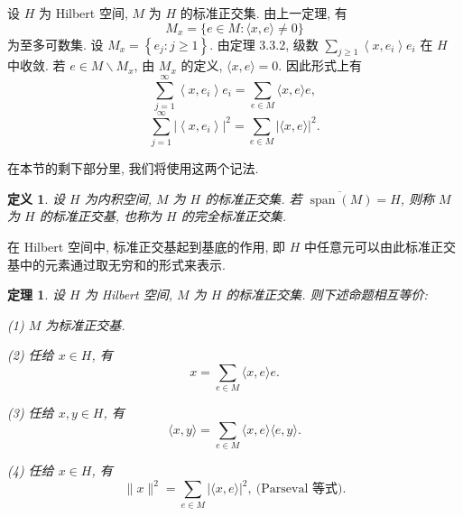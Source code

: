 \documentclass[openany]{ctexbook}
\theoremstyle{kaiti}
\newtheorem{definition}{定义}[section]
\newtheorem{theorem}{定理}[section]
\theoremstyle{normal}
\begin{document}
设 $H$ 为 Hilbert 空间, $M$ 为 $H$ 的标准正交集. 由上一定理, 有
$$
M_{x}=\{e \in M:\langle x, e\rangle \neq 0\}
$$
为至多可数集. 设 $M_{x}=\left\{e_{j}: j \geqslant 1\right\}$. 由定理 3.3.2, 级数 $\sum_{j \geqslant 1}\left\langle x, e_{i}\right\rangle e_{i}$ 在 $H$ 中收敛. 若 $e \in M \backslash M_{x}$, 由 $M_{x}$ 的定义, $\langle x, e\rangle=0$. 因此形式上有
\begin{equation}
  \sum_{j=1}^{\infty}\left\langle x, e_{i}\right\rangle e_{i}=\sum_{e \in M}\langle x, e\rangle e,
\end{equation}
\begin{equation}
  \sum_{j=1}^{\infty}\left|\left\langle x, e_{i}\right\rangle\right|^2=\sum_{e \in M}|\langle x, e\rangle|^2.
\end{equation}

在本节的剩下部分里, 我们将使用这两个记法.

\begin{definition}
  设 $H$ 为内积空间, $M$ 为 $H$ 的标准正交集. 若 $\overline{\operatorname{span}(M)}=H$, 则称 $M$ 为 $H$ 的标准正交基, 也称为 $H$ 的完全标准正交集.
\end{definition}

在 Hilbert 空间中, 标准正交基起到基底的作用, 即 $H$ 中任意元可以由此标准正交基中的元素通过取无穷和的形式来表示.

\begin{theorem}
设 $H$ 为 Hilbert 空间, $M$ 为 $H$ 的标准正交集. 则下述命题相互等价:

(1) $M$ 为标准正交基.

(2) 任给 $x \in H$, 有
\begin{equation}
  x=\sum_{e \in M}\langle x, e\rangle e.
\end{equation}

(3) 任给 $x, y \in H$, 有
\begin{equation}
  \langle x, y\rangle=\sum_{e \in M}\langle x, e\rangle\langle e, y\rangle.
\end{equation}

(4) 任给 $x \in H$, 有
\begin{equation}
  \|x\|^2=\sum_{e \in M}|\langle x, e\rangle|^2,~\text{(Parseval 等式)}.
\end{equation}
\end{theorem}
\end{document}
